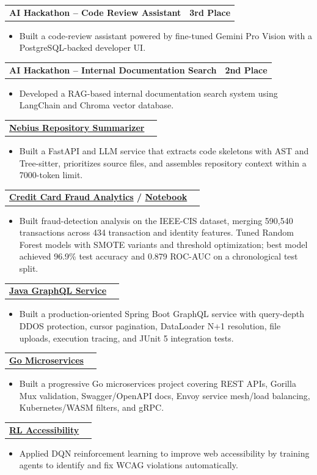 \documentclass[letterpaper,11pt]{article}
\makeatletter
\newcommand{\resumeItem}[1]{
  \item\small{
    {#1 \vspace{-3pt}}
  }
}
\newcommand{\resumeProjectHeading}[2]{
  \vspace{-3pt}\item
    \begin{tabular*}{1.0\textwidth}[t]{l@{\extracolsep{\fill}}r}
      \textbf{#1} & \textbf{\small #2} \\
    \end{tabular*}\vspace{-7pt}
}
\newcommand{\resumeItemListStart}{\begin{itemize}}
\newcommand{\resumeItemListEnd}{\end{itemize}\vspace{0pt}}
\makeatother
\begin{document}
  \resumeProjectHeading
    {AI Hackathon -- Code Review Assistant}{3rd Place}
  \resumeItemListStart
    \resumeItem{Built a code-review assistant powered by fine-tuned Gemini Pro Vision with a PostgreSQL-backed developer UI.}
  \resumeItemListEnd

  \resumeProjectHeading
    {AI Hackathon -- Internal Documentation Search}{2nd Place}
  \resumeItemListStart
    \resumeItem{Developed a RAG-based internal documentation search system using LangChain and Chroma vector database.}
  \resumeItemListEnd

  \resumeProjectHeading
    {\href{https://github.com/aymanapatel/nebius-project}{Nebius Repository Summarizer}}{}
  \resumeItemListStart
    \resumeItem{Built a FastAPI and LLM service that extracts code skeletons with AST and Tree-sitter, prioritizes source files, and assembles repository context within a 7000-token limit.}
  \resumeItemListEnd

  \resumeProjectHeading
    {\href{https://github.com/aymanpatel/qmul-all-projects/blob/main/data-analytics/coursework1/credit-card-report.pdf}{Credit Card Fraud Analytics} / \href{https://github.com/aymanpatel/qmul-all-projects/blob/main/data-analytics/coursework1/credit-card-notebook.ipynb}{Notebook}}{}
  \resumeItemListStart
    \resumeItem{Built fraud-detection analysis on the IEEE-CIS dataset, merging 590,540 transactions across 434 transaction and identity features. Tuned Random Forest models with SMOTE variants and threshold optimization; best model achieved 96.9\% test accuracy and 0.879 ROC-AUC on a chronological test split.}
  \resumeItemListEnd

  \resumeProjectHeading
    {\href{https://github.com/aymanapatel/java-graphql}{Java GraphQL Service}}{}
  \resumeItemListStart
    \resumeItem{Built a production-oriented Spring Boot GraphQL service with query-depth DDOS protection, cursor pagination, DataLoader N+1 resolution, file uploads, execution tracing, and JUnit 5 integration tests.}
  \resumeItemListEnd

  \resumeProjectHeading
    {\href{https://github.com/aymanapatel/golang-microservices}{Go Microservices}}{}
  \resumeItemListStart
    \resumeItem{Built a progressive Go microservices project covering REST APIs, Gorilla Mux validation, Swagger/OpenAPI docs, Envoy service mesh/load balancing, Kubernetes/WASM filters, and gRPC.}
  \resumeItemListEnd

  \resumeProjectHeading
    {\href{https://github.com/aymanapatel/rl-a11y}{RL Accessibility}}{}
  \resumeItemListStart
    \resumeItem{Applied DQN reinforcement learning to improve web accessibility by training agents to identify and fix WCAG violations automatically.}
  \resumeItemListEnd
\end{document}
